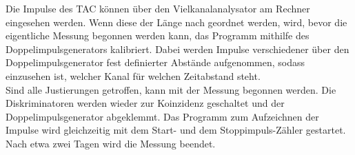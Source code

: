 Die Impulse des TAC können über den Vielkanalanalysator am Rechner eingesehen werden.
Wenn diese der Länge nach geordnet werden, wird, bevor die eigentliche Messung begonnen werden kann, das Programm mithilfe des Doppelimpulsgenerators kalibriert.
Dabei werden Impulse verschiedener über den Doppelimpulsgenerator fest definierter Abstände aufgenommen, sodass einzusehen ist, welcher Kanal für welchen Zeitabstand steht.\\
Sind alle Justierungen getroffen, kann mit der Messung begonnen werden.
Die Diskriminatoren werden wieder zur Koinzidenz geschaltet und der Doppelimpulsgenerator abgeklemmt.
Das Programm zum Aufzeichnen der Impulse wird gleichzeitig mit dem Start- und dem Stoppimpuls-Zähler gestartet.
Nach etwa zwei Tagen wird die Messung beendet.
